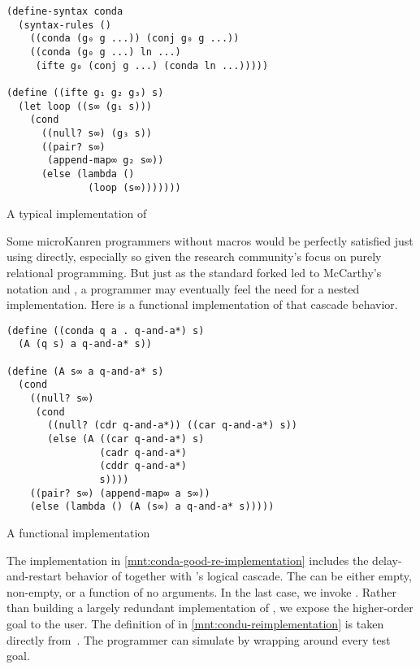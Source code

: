 \documentclass[sigplan,draft,balance,pbalance,natbib=false]{acmart}
\begin{document}
\begin{listing}
  \begin{verbatim}
(define-syntax conda
  (syntax-rules ()
    ((conda (g₀ g ...)) (conj g₀ g ...))
    ((conda (g₀ g ...) ln ...)
     (ifte g₀ (conj g ...) (conda ln ...)))))

(define ((ifte g₁ g₂ g₃) s)
  (let loop ((s∞ (g₁ s)))
    (cond
      ((null? s∞) (g₃ s))
      ((pair? s∞)
       (append-map∞ g₂ s∞))
      (else (lambda ()
              (loop (s∞)))))))
  \end{verbatim}
  \caption{A typical implementation of }
  \label{mnt:conda-implementation}
\end{listing}

Some microKanren programmers without macros would be perfectly
satisfied just using  directly, especially so given
the research community's focus on purely relational programming. But
just as the standard forked  led to
McCarthy's  notation and , a
programmer may eventually feel the need for a nested implementation.
Here is a functional implementation of that cascade behavior.

\begin{listing}
  \begin{verbatim}
(define ((conda q a . q-and-a*) s)
  (A (q s) a q-and-a* s))

(define (A s∞ a q-and-a* s)
  (cond
    ((null? s∞)
     (cond
       ((null? (cdr q-and-a*)) ((car q-and-a*) s))
       (else (A ((car q-and-a*) s)
                (cadr q-and-a*)
                (cddr q-and-a*)
                s))))
    ((pair? s∞) (append-map∞ a s∞))
    (else (lambda () (A (s∞) a q-and-a* s)))))
  \end{verbatim}
  \caption{A functional  implementation}
  \label{mnt:conda-good-re-implementation}
\end{listing}

The implementation in \cref{mnt:conda-good-re-implementation} includes
the delay-and-restart behavior of  together
with 's logical cascade. The  can be
either empty, non-empty, or a function of no arguments. In the last
case, we invoke . Rather than building a largely
redundant implementation of , we expose the
higher-order goal  to the user. The definition
of  in \cref{mnt:condu-reimplementation} is taken
directly from~\cite{friedman2018reasoned}. The programmer can
simulate  by wrapping  around every
test goal.
\end{document}
